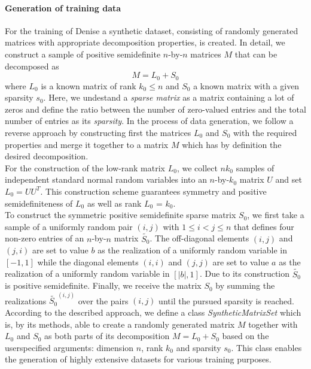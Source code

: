 \paragraph{Generation of training data}
For the training of Denise a synthetic dataset, consisting of randomly generated matrices with appropriate decomposition properties, is created. In detail, we construct a sample of positive semidefinite $n$-by-$n$ matrices $M$ that can be decomposed as
\[
 M = L_0 + S_0
\]
where $L_0$ is a known matrix of rank $k_0 \leq n$ and $S_0$ a known matrix with a given sparsity $s_0$. Here, we undestand a \textit{sparse matrix} as a matrix containing a lot of zeros and define the ratio between the number of zero-valued entries and the total number of entries as its \textit{sparsity}. In the process of data generation, we follow a reverse approach by constructing first the matrices $L_0$ and $S_0$ with the required properties and merge it together to a matrix $M$ which has by definition the desired decomposition.\\

For the construction of the low-rank matrix $L_0$, we collect $nk_0$ samples of independent standard normal random variables into an $n$-by-$k_0$ matrix $U$ and set $L_0 = UU^T$. This construction scheme guarantees symmetry and positive semidefiniteness of $L_0$ as well as rank $L_0$ = $k_0$.\\

To construct the symmetric positive semidefinite sparse matrix $S_0$, we first take a sample of a uniformly random pair $(i,j)$ with $1 \leq i < j \leq n$ that defines four non-zero entries of an $n$-by-$n$ matrix $\tilde{S_0}$. The off-diagonal elements $(i,j)$ and $(j,i)$ are set to value $b$ as the realization of a uniformly random variable in $[-1,1]$ while the diagonal elements $(i,i)$ and $(j,j)$ are set to value $a$ as the realization of a uniformly random variable in $[\vert b \vert,1]$. Due to its construction $\tilde{S_0}$ is positive semidefinite. Finally, we receive the matrix $S_0$ by summing the realizations $\tilde{S_0}^{(i,j)}$ over the pairs $(i,j)$ until the pursued sparsity is reached.\\

According to the described approach, we define a class \textit{SyntheticMatrixSet} which is, by its methods, able to create a randomly generated matrix $M$ together with $L_0$ and $S_0$ as both parts of its decomposition  $M = L_0 + S_0$ based on the userspecified arguments: dimension $n$, rank $k_0$ and sparsity $s_0$. This class enables the generation of highly extensive datasets for various training purposes.

